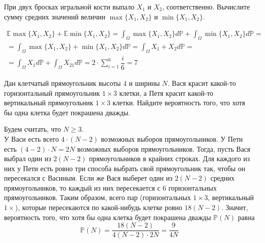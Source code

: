 \begin{problem}
    При двух бросках игральной кости выпало $X_1$ и $X_2$, соответственно. Вычислите сумму средних значений величин $\max\{X_1, X_2\}$ и $\min\{X_1, X_2\}$.
\end{problem}
\begin{solution}
    \begin{multline*}
        \mathbb{E}\max\{X_1, X_2\} + \mathbb{E}\min\{X_1, X_2\} = \int_\Omega \max\{X_1, X_2\}d\mathbb{P} + \int_\Omega \min\{X_1, X_2\}d\mathbb{P} =  \\ = \int_\Omega \max\{X_1, X_2\} + \min\{X_1, X_2\}d\mathbb{P} = \int_\Omega X_1 + X_2d\mathbb{P} = \\ = \int_\Omega X_1d\mathbb{P} + \int_\Omega X_21d\mathbb{P} = 2 \cdot \sum\limits_{i = 1}^6 \dfrac{i}{6} = 7
    \end{multline*}
\end{solution}
\begin{problem}
    Дан клетчатый прямоугольник высоты 4 и ширины $N$. Вася красит какой-то горизонтальный прямоугольник $1 \times 3$ клетки, а Петя красит какой-то вертикальный прямоугольник $1 \times 3$ клетки. Найдите вероятность того, что хотя бы одна клетка будет покрашена дважды.
\end{problem}
\begin{solution}
    Будем считать, что $N \geq 3$. \\
    У Васи есть всего $4 \cdot (N - 2)$ возможных выборов прямоугольников. У Пети есть $(4 - 2)\cdot N = 2N$  возможных выборов прямоугольников. Тогда, пусть Вася выбрал один из $2(N - 2)$ прямоугольников в крайних строках. Для каждого из них у Пети есть ровно три способа выбрать свой прямоугольник так, чтобы он пересекался с Васиным. Если же Вася выберет один из $2(N - 2)$ средних прямоугольников, то каждый из них пересекается с 6 горизонтальных прямоугольников. Таким образом, всего пар (горизонтальных $1 \times 3$, вертикальный $1 \times$), которые пересекаются по какой-нибудь клетке ровно $18(N - 2)$. Значит, вероятность того, что хотя бы одна клетка будет покрашена дважды $\mathbb{P}(N)$ равна \[
                                                                                                                                                                                                                                                                                                                                                                                                                                                                                                                                                                                                                                                                                                                                       \mathbb{P}(N) = \dfrac{18(N - 2)}{4(N - 2)\cdot 2N} = \dfrac{9}{4N}
    \]
\end{solution}
